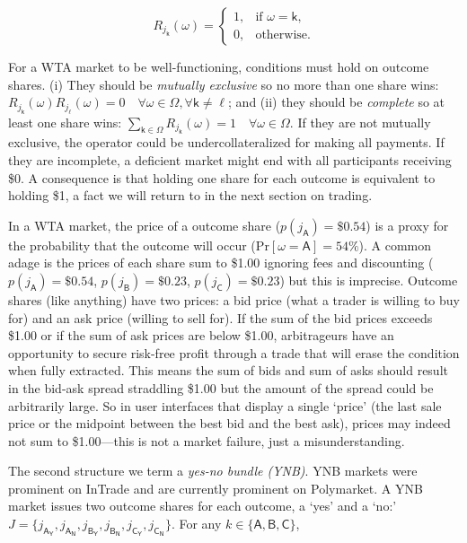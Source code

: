 \[R_{j_{\mathsf{k}}}(\omega)=\begin{cases}1, & \text{if } \omega=\mathsf{k},\\0, & \text{otherwise.}\end{cases}\]

For a WTA market to be well-functioning, conditions must hold on outcome shares. (i) They should be \textit{mutually exclusive} so no more than one share wins: $R_{j_{\mathsf{k}}}(\omega)R_{j_{\mathsf{\ell}}}(\omega)=0 \quad \forall\omega\in\Omega, \forall\mathsf{k}\neq\mathsf{\ell} $; and (ii) they should be \textit{complete} so at least one share wins: $\sum_{\mathsf{k}\in\Omega} R_{j_{\mathsf{k}}}(\omega)=1\quad \forall \omega\in\Omega$. If they are not mutually exclusive, the operator could be undercollateralized for making all payments. If they are incomplete, a deficient market might end with all participants receiving \$0. A consequence is that holding one share for each outcome is equivalent to holding \$1, a fact we will return to in the next section on trading. 

In a WTA market, the price of a outcome share (\eg $p(j_\mathsf{A})=\$0.54$) is a proxy for the probability that the outcome will occur (\eg $\mathrm{Pr}[\omega=\mathsf{A}]=54\%$). A common adage is the prices of each share sum to \$1.00 ignoring fees and discounting (\eg $p(j_\mathsf{A})=\$0.54$, $p(j_\mathsf{B})=\$0.23$, $p(j_\mathsf{C})=\$0.23$) but this is imprecise. Outcome shares (like anything) have two prices: a bid price (what a trader is willing to buy for) and an ask price (willing to sell for). If the sum of the bid prices exceeds \$1.00 or if the sum of ask prices are below \$1.00, arbitrageurs have an opportunity to secure risk-free profit through a trade that will erase the condition when fully extracted. This means the sum of bids and sum of asks should result in the bid-ask spread straddling \$1.00 but the amount of the spread could be arbitrarily large. So in user interfaces that display a single `price' (\eg the last sale price or the midpoint between the best bid and the best ask), prices may indeed not sum to \$1.00---this is not a market failure, just a misunderstanding.  

 
The second structure we term a \textit{yes-no bundle (YNB)}. YNB markets were prominent on InTrade and are currently prominent on Polymarket. A YNB market issues two outcome shares for each outcome, a `yes' and a `no:'  $J=\{j_{\mathsf{A_Y}}, j_{\mathsf{A_N}}, j_{\mathsf{B_Y}}, j_{\mathsf{B_N}}, j_{\mathsf{C_Y}},j_{\mathsf{C_N}} \}$. For any $k\in\{\mathsf{A},\mathsf{B},\mathsf{C}\}$,


